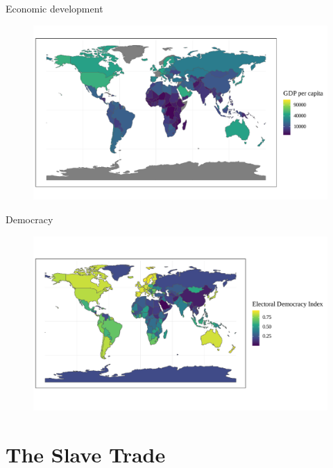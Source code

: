 \documentclass{beamer}
\begin{document}
\begin{frame}{Economic development}
	\begin{figure}
		\includegraphics[width=\linewidth]{img/gdpplot.pdf}
	\end{figure}
\end{frame}

\begin{frame}{Democracy}
	\begin{figure}
		\includegraphics[width=\linewidth]{img/vdemplot.pdf}
	\end{figure}
\end{frame}

\section{The Slave Trade}
\end{document}
